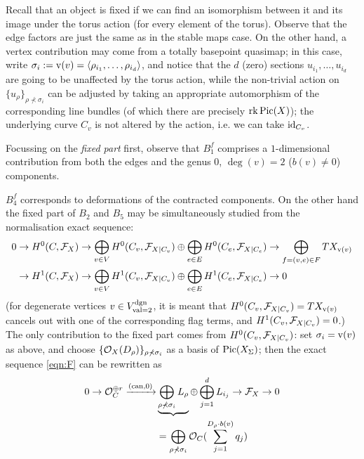 Recall that an object is fixed if we can find an isomorphism between it and its image under the torus action (for every element of the torus). Observe that the edge factors are just the same as in the stable maps case. On the other hand, a vertex contribution may come from a totally basepoint quasimap; in this case, write $\sigma_i:=\operatorname{v}(v)=\langle \rho_{i_1},\ldots,\rho_{i_d}\rangle$, and notice that the $d$ (zero) sections $u_{i_1},\ldots,u_{i_d}$ are going to be unaffected by the torus action, while the non-trivial action on $\{u_\rho\}_{\rho\nprec\sigma_i}$ can be adjusted by taking an appropriate automorphism of the corresponding line bundles (of which there are precisely $\operatorname{rk}\operatorname{Pic}(X)$); the underlying curve $C_v$ is not altered by the action, i.e. we can take $\mathrm{id}_{C_v}$.

Focussing on the \emph{fixed part} first, observe that $B_1^f$ comprises a $1$-dimensional contribution from both the edges and the genus $0$, $\deg(v)=2$ ($b(v)\neq 0$) components. \begin{comment}, which cancels out with a corresponding term in $B_4^f$; this corresponds to the automorphism of a two-pointed rational curve. The remaining part of \end{comment} 
$B_4^f$ corresponds to deformations of the contracted components. On the other hand the fixed part of $B_2$ and $B_5$ may be simultaneously studied from the normalisation exact sequence:
\begin{equation*}%
\begin{aligned}
 0&\to H^0(C,\F_X)\to \bigoplus_{v\in V}H^0(C_v,\F_{X|C_v})\oplus \bigoplus_{e\in E}H^0(C_e,\F_{X|C_e})\to \bigoplus_{f=(v,e)\in F} TX_{\vv(v)} \\
 &\to H^1(C,\F_X)\to \bigoplus_{v\in V}H^1(C_v,\F_{X|C_v})\oplus \bigoplus_{e\in E}H^1(C_e,\F_{X|C_e})\to 0
\end{aligned} 
\end{equation*}
(for degenerate vertices $v\in V^\text{dgn}_{\operatorname{val}=2}$, it is meant that $H^0(C_v,\mathcal F_{X|C_v})=TX_{\operatorname{v}(v)}$ cancels out with one of the corresponding flag terms, and $H^1(C_v,\mathcal F_{X|C_v})=0$.) The only contribution to the fixed part comes from $H^0(C_v,\mathcal F_{X|C_v})$: set $\sigma_i=\operatorname{v}(v)$ as above, and choose $\{\mathcal{O}_X(D_\rho)\}_{\rho\nprec\sigma_i}$ as a basis of $\operatorname{Pic}(X_\Sigma)$; then the exact sequence \eqref{eqn:F} can be rewritten as
\begin{equation}\label{eqn:Fbasis}
 \begin{aligned}
 0\rightarrow\mathcal{O}_C^{\oplus r}\xrightarrow{\left(\text{can},0\right)} & \underbrace{\bigoplus_{\rho\nprec\sigma_i} L_\rho}\oplus\bigoplus_{j=1}^d L_{i_j}\rightarrow\mathcal F_X\rightarrow 0 \\
 & = \bigoplus_{\rho\nprec\sigma_i}\mathcal{O}_C(\sum_{j=1}^{D_\rho\cdot b(v)}q_j)
\end{aligned}
\end{equation}
